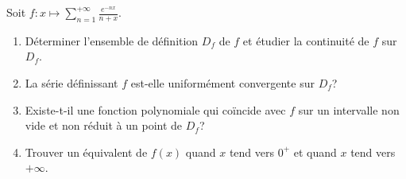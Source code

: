 \begin{enonce}
\begin{exercise}[ID={RMS126 E775},subtitle={Centrale PSI 2015},tags={}, difficulty={0}]
Soit $f:x\mapsto \sum_{n=1}^{+\infty} \frac{e^{-nx}}{n+x}$.
\begin{enumerate}
  \item Déterminer l'ensemble de définition $D_f$ de $f$ et étudier la continuité de $f$ sur $D_f$.
  \item La série définissant $f$ est-elle uniformément convergente sur $D_f$?
  \item Existe-t-il une fonction polynomiale qui coïncide avec $f$ sur un intervalle non vide et non réduit à un point de $D_f$?
  \item Trouver un équivalent de $f(x)$ quand $x$ tend vers $0^+$ et quand $x$ tend vers $+\infty$.
\end{enumerate}
\end{exercise}
\begin{solution}
\end{solution}
\end{enonce}
